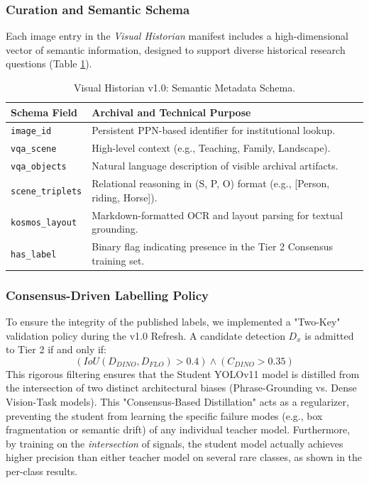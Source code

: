 \documentclass[12pt,onecolumn,a4paper]{IEEEtran}
\begin{document}
\subsubsection{Curation and Semantic Schema}
Each image entry in the \textit{Visual Historian} manifest includes a high-dimensional vector of semantic information, designed to support diverse historical research questions (Table \ref{tab:metadata_schema}).

\begin{table}[H]
\centering
\caption{Visual Historian v1.0: Semantic Metadata Schema.}
\label{tab:metadata_schema}
\begin{tabular}{lp{10cm}}
\toprule
Schema Field & Archival and Technical Purpose \\
\midrule
\texttt{image\_id} & Persistent PPN-based identifier for institutional lookup. \\
\texttt{vqa\_scene} & High-level context (e.g., Teaching, Family, Landscape). \\
\texttt{vqa\_objects} & Natural language description of visible archival artifacts. \\
\texttt{scene\_triplets} & Relational reasoning in (S, P, O) format (e.g., [Person, riding, Horse]). \\
\texttt{kosmos\_layout} & Markdown-formatted OCR and layout parsing for textual grounding. \\
\texttt{has\_label} & Binary flag indicating presence in the Tier 2 Consensus training set. \\
\bottomrule
\end{tabular}
\end{table}

\subsubsection{Consensus-Driven Labelling Policy}
To ensure the integrity of the published labels, we implemented a "Two-Key" validation policy during the v1.0 Refresh. A candidate detection $D_x$ is admitted to Tier 2 if and only if:
\begin{equation}
    (IoU(D_{DINO}, D_{FLO}) > 0.4) \land (C_{DINO} > 0.35)
\end{equation}
This rigorous filtering ensures that the Student YOLOv11 model is distilled from the intersection of two distinct architectural biases (Phrase-Grounding vs. Dense Vision-Task models). This "Consensus-Based Distillation" acts as a regularizer, preventing the student from learning the specific failure modes (e.g., box fragmentation or semantic drift) of any individual teacher model. Furthermore, by training on the \textit{intersection} of signals, the student model actually achieves higher precision than either teacher model on several rare classes, as shown in the per-class results.
\end{document}
